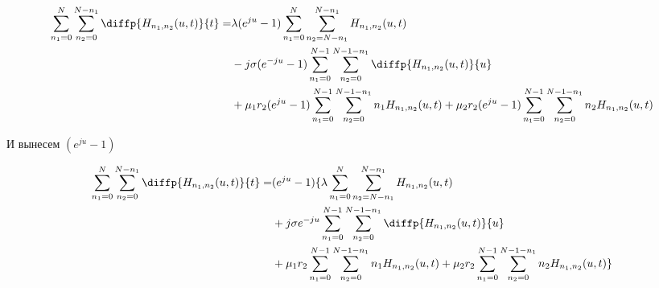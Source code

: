 \begin{equation*}
	\begin{aligned}
		\sum_{n_1=0}^N\sum_{n_2=0}^{N-n_1} \diffp{H_{n_1,n_2}(u,t)}{t}=
		&\lambda (e^{ju} - 1)\sum_{n_1=0}^N\sum_{n_2=N-n_1}^{N-n_1} 
		H_{n_1, n_2}(u,t)\\
		&- j \sigma(e^{-ju}-1)\sum_{n_1=0}^{N-1}\sum_{n_2=0}^{N-1-n_1} 
		\diffp{H_{n_1, n_2}(u,t)}{u}\\
		&+\mu_1 r_2 (e^{ju} -1)\sum_{n_1=0}^{N-1}\sum_{n_2=0}^{N-1-n_1} 
		n_1 H_{n_1, n_2}(u,t)
		+\mu_2 r_2 (e^{ju} -1)\sum_{n_1=0}^{N-1}\sum_{n_2=0}^{N-1-n_1} 
		n_2 H_{n_1, n_2}(u,t)\\
	\end{aligned}
\end{equation*}

И вынесем $(e^{ju} - 1)$

\begin{equation*}
	\begin{aligned}
		\sum_{n_1=0}^N\sum_{n_2=0}^{N-n_1} \diffp{H_{n_1,n_2}(u,t)}{t}=
		&(e^{ju} - 1)\{\lambda \sum_{n_1=0}^N\sum_{n_2=N-n_1}^{N-n_1} 
		H_{n_1, n_2}(u,t)\\
		&+ j \sigma e^{-ju}\sum_{n_1=0}^{N-1}\sum_{n_2=0}^{N-1-n_1} 
		\diffp{H_{n_1, n_2}(u,t)}{u}\\
		&+\mu_1 r_2 \sum_{n_1=0}^{N-1}\sum_{n_2=0}^{N-1-n_1} 
		n_1 H_{n_1, n_2}(u,t)
		+\mu_2 r_2 \sum_{n_1=0}^{N-1}\sum_{n_2=0}^{N-1-n_1} 
		n_2 H_{n_1, n_2}(u,t)\}\\
	\end{aligned}
\end{equation*}
